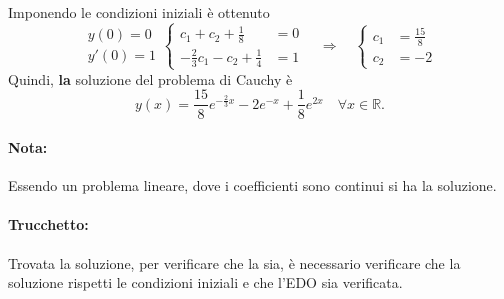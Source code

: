 \begin{example}
\begin{equation*}
	\end{equation*}
	Imponendo le condizioni iniziali è ottenuto
	\begin{equation*}
		\begin{matrix}
			y(0)=0\\
			y'(0)=1
		\end{matrix}
		\begin{cases}
			c_1 +c_2+ \frac{1}{8} &=0\\
			-\frac{2}{3} c_1 - c_2 + \frac{1}{4} &= 1
		\end{cases}\quad\Rightarrow\quad
		\begin{cases}
			c_1 &=\frac{15}{8}\\
			c_2 &= -2
		\end{cases}
	\end{equation*}
	Quindi, \textbf{la} soluzione del problema di Cauchy è
	\begin{equation*}
		y(x) = \frac{15}{8} e^{-\frac{2}{3}x} - 2 e^{-x} + \frac{1}{8} e^{2x}\quad\forall x\in\mathbb{R}.
	\end{equation*}
	\paragraph{Nota:} Essendo un problema lineare, dove i coefficienti sono continui si ha la soluzione.
	\paragraph{Trucchetto:} Trovata la soluzione, per verificare che la sia, è necessario verificare che la soluzione rispetti le condizioni iniziali e che l'EDO sia verificata.
\end{example}

